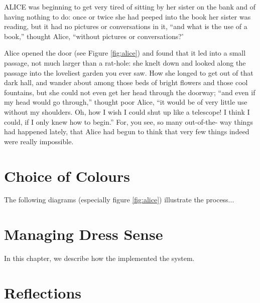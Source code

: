 \documentclass{l3proj}
\begin{document}
ALICE \cite{alice} was beginning to get very tired of sitting by her sister
on the bank and of having nothing to do: once or twice she had peeped into
the book her sister was reading, but it had no pictures or conversations in
it, ``and what is the use of a book,'' thought Alice, ``without pictures or
conversations?'



Alice opened the door (see Figure \ref{fig:alice}) and found that it
led into a small passage, not much larger than a rat-hole: she knelt
down and looked along the passage into the loveliest garden you ever
saw. How she longed to get out of that dark hall, and wander about
among those beds of bright flowers and those cool fountains, but she
could not even get her head through the doorway; ``and even if my head
would go through,'' thought poor Alice, ``it would be of very little
use without my shoulders. Oh, how I wish I could shut up like a
telescope! I think I could, if I only knew how to begin.'' For, you
see, so many out-of-the- way things had happened lately, that Alice
had begun to think that very few things indeed were really impossible.


\section{Choice of Colours}
\label{design}

The following diagrams (especially figure \ref{fig:alice}) illustrate the
process...

\section{Managing Dress Sense}
\label{managing}

In this chapter, we describe how the implemented the system.

\section{Reflections}
\label{sec:reflections}
\end{document}
